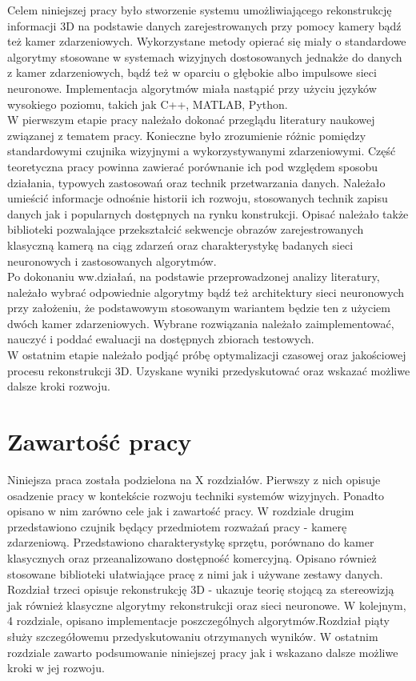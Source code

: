 Celem niniejszej pracy było stworzenie systemu umożliwiającego rekonstrukcję informacji 3D na podstawie danych zarejestrowanych przy pomocy kamery bądź też kamer zdarzeniowych. Wykorzystane metody opierać się miały o  standardowe algorytmy stosowane w systemach wizyjnych dostosowanych jednakże do danych z kamer zdarzeniowych, bądź też w oparciu o głębokie albo impulsowe sieci neuronowe. Implementacja algorytmów miała nastąpić przy użyciu języków wysokiego poziomu, takich jak C++, MATLAB, Python.\\
\indent W pierwszym etapie pracy należało dokonać przeglądu literatury naukowej związanej z tematem pracy. Konieczne było zrozumienie różnic pomiędzy standardowymi czujnika wizyjnymi a wykorzystywanymi zdarzeniowymi. Część teoretyczna pracy powinna zawierać porównanie ich pod względem sposobu działania, typowych zastosowań oraz technik przetwarzania danych. Należało umieścić informacje odnośnie historii ich rozwoju, stosowanych technik zapisu danych jak i  popularnych dostępnych na rynku konstrukcji. Opisać należało także biblioteki pozwalające przekształcić sekwencje obrazów zarejestrowanych klasyczną kamerą na ciąg zdarzeń oraz charakterystykę badanych sieci neuronowych i zastosowanych algorytmów.\\
\indent Po dokonaniu ww.działań, na podstawie przeprowadzonej analizy literatury, należało wybrać odpowiednie algorytmy bądź też architektury sieci neuronowych przy założeniu, że podstawowym stosowanym wariantem będzie ten z użyciem dwóch kamer zdarzeniowych. Wybrane rozwiązania należało zaimplementować, nauczyć i poddać ewaluacji na dostępnych zbiorach testowych.\\
\indent W ostatnim etapie należało podjąć próbę optymalizacji czasowej oraz jakościowej procesu rekonstrukcji 3D. Uzyskane wyniki przedyskutować oraz wskazać możliwe dalsze kroki rozwoju.

\section{Zawartość pracy}
\label{sec:zawartoscPracy}

Niniejsza praca została podzielona na X rozdziałów. Pierwszy z nich opisuje osadzenie pracy w kontekście rozwoju techniki systemów wizyjnych. Ponadto opisano w nim zarówno cele jak i zawartość pracy. W rozdziale drugim przedstawiono czujnik będący przedmiotem rozważań pracy - kamerę zdarzeniową. Przedstawiono charakterystykę sprzętu, porównano do kamer klasycznych oraz przeanalizowano dostępność komercyjną. Opisano również stosowane biblioteki ułatwiające pracę z nimi jak i używane zestawy danych. Rozdział trzeci opisuje rekonstrukcję 3D - ukazuje teorię stojącą za stereowizją jak również klasyczne algorytmy rekonstrukcji oraz sieci neuronowe. W kolejnym, 4 rozdziale, opisano implementacje poszczególnych algorytmów.Rozdział piąty służy szczegółowemu przedyskutowaniu otrzymanych wyników. W ostatnim rozdziale zawarto podsumowanie niniejszej pracy jak i wskazano dalsze możliwe kroki w jej rozwoju.


